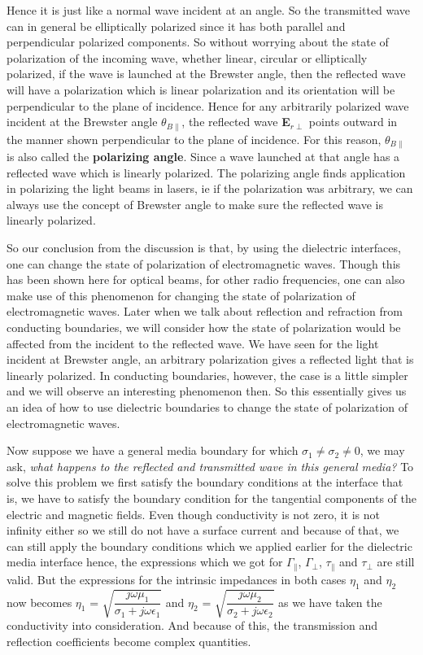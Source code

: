 Hence it is just like a normal wave incident at an angle. So the transmitted wave can in general be elliptically polarized since it has both parallel and perpendicular polarized components.
So without worrying about the state of polarization of the incoming wave, whether linear, circular or elliptically polarized, if the wave is launched at the Brewster angle, then the reflected wave will have a polarization which is linear polarization and its orientation will be perpendicular to the plane of incidence. Hence for any arbitrarily polarized wave incident at the Brewster angle $\theta_{B\parallel}$, the reflected wave \textbf{E}$_{r\perp}$ points outward in the manner shown perpendicular to the plane of incidence. For this reason, $\theta_{B\parallel}$ is also called the \textbf{polarizing angle}. Since a wave launched at that angle has a reflected wave which is linearly polarized. The polarizing angle finds application in polarizing the light beams in lasers, ie if the polarization was arbitrary, we can always use the concept of Brewster angle to make sure the reflected wave is linearly polarized. 

So our conclusion from the discussion is that, by using the dielectric interfaces, one can change the state of polarization of electromagnetic waves. Though this has been shown here for optical beams, for other radio frequencies, one can also make use of this phenomenon for changing the state of polarization of electromagnetic waves.
Later when we talk about reflection and refraction from conducting boundaries, we will consider how the state of polarization would be affected from the incident to the reflected wave.  We have seen for the light incident at Brewster angle, an arbitrary polarization gives a reflected light that is linearly polarized. In conducting boundaries, however, the case is a little simpler and we will observe an interesting phenomenon then. 
So this essentially gives us an idea of how to use dielectric boundaries to change the state of polarization of electromagnetic waves. 

Now suppose we have a general media boundary for which $\sigma_1 \neq \sigma_2 \neq 0$, we may ask, \emph{what happens to the reflected and transmitted wave in this general media?} To solve this problem we first satisfy the boundary conditions at the interface that is, we have to satisfy the boundary condition for the tangential components of the electric and magnetic fields. Even though conductivity is not zero, it is not infinity either so we still do not have a surface current and because of that, we can still apply the boundary conditions which we applied earlier for the dielectric media interface hence, the expressions which we got for $\Gamma_\parallel$, $\Gamma_\perp$, $\tau_\parallel$ and $\tau_\perp$ are still valid.  But the expressions for the intrinsic impedances in both cases $\eta_1$ and $\eta_2$ now becomes $\eta_1$ = $\sqrt{\dfrac{j\omega\mu_1}{\sigma_1 + j\omega\epsilon_1}}$ and $\eta_2$ = $\sqrt{\dfrac{j\omega\mu_2}{\sigma_2 + j\omega\epsilon_2}}$ as we have taken the conductivity into consideration. And because of this, the transmission and reflection coefficients become complex quantities.

